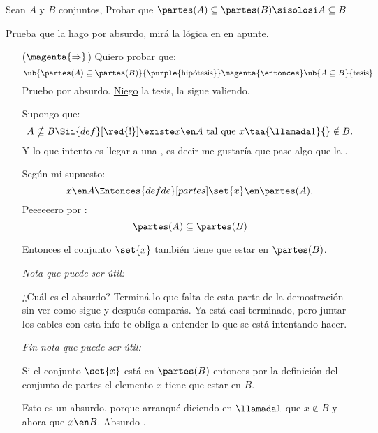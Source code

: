\begin{enunciado}{\ejercicio}
  Sean $A$ y $B$ conjuntos, Probar que $\partes(A) \subseteq \partes(B) \sisolosi A \subseteq B$
\end{enunciado}

Prueba que la hago por absurdo, \hyperlink{teoria-1:absurdo}{mirá la lógica en en apunte.}

\begin{itemize}
  \item[($\magenta{\Rightarrow}$)] Quiero probar que:
        $$
          \ub{\partes(A) \subseteq \partes(B)}{\purple{\text{hipótesis}}}  \magenta{\entonces} \ub{A \subseteq B}{\text{tesis}}
        $$
        Pruebo por absurdo. \underline{Niego} la tesis, la  sigue valiendo.\par

        Supongo que:
        $$
          A \nsubseteq B \Sii{def}[\red{!}] \existe x \en A \text{ tal que } x \taa{\llamada1}{}\notin B.
        $$
        Y lo que intento es llegar a una , es decir me gustaría que pase algo que 
        la .\par
        Según mi supuesto:
        $$
          x \en A
          \Entonces{def de}[partes]
          \set{x} \en \partes(A).
        $$
        Peeeeeero\red{!!} por :
        $$
          \partes(A) \subseteq \partes(B)
        $$

        Entonces el conjunto $\set{x}$ también tiene que estar en $\partes(B)$.\par

        \textit{Nota que puede ser útil:}\par
        ¿Cuál es el absurdo? Terminá lo que falta de esta parte de la demostración sin ver
        como sigue y después comparás. \href{\justDoIt}{}
        Ya está casi terminado, pero juntar los cables con esta info te obliga a entender lo que se está intentando hacer.\par
        \textit{Fin nota que puede ser útil:}\par

        Si el conjunto $\set{x}$ está en $\partes(B)$ entonces por la definición
        del conjunto de partes el elemento $x$ tiene que estar en $B$.\par
        Esto es un absurdo, porque arranqué diciendo en $\llamada1$ que $x \notin B$ y ahora que $x \en B$. Absurdo .


\end{itemize}
